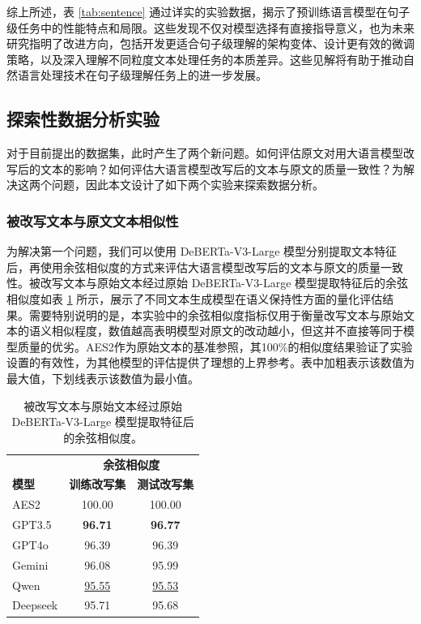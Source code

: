 综上所述，表 \ref{tab:sentence} 通过详实的实验数据，揭示了预训练语言模型在句子级任务中的性能特点和局限。这些发现不仅对模型选择有直接指导意义，也为未来研究指明了改进方向，包括开发更适合句子级理解的架构变体、设计更有效的微调策略，以及深入理解不同粒度文本处理任务的本质差异。这些见解将有助于推动自然语言处理技术在句子级理解任务上的进一步发展。

\subsection{探索性数据分析实验}
\label{sec:method-experiment-analysis}

对于目前提出的数据集，此时产生了两个新问题。如何评估原文对用大语言模型改写后的文本的影响？如何评估大语言模型改写后的文本与原文的质量一致性？为解决这两个问题，因此本文设计了如下两个实验来探索数据分析。

\subsubsection{被改写文本与原文文本相似性}

为解决第一个问题，我们可以使用 DeBERTa-V3-Large 模型分别提取文本特征后，再使用余弦相似度的方式来评估大语言模型改写后的文本与原文的质量一致性。被改写文本与原始文本经过原始 DeBERTa-V3-Large 模型提取特征后的余弦相似度如表 \ref{tab:cos} 所示，展示了不同文本生成模型在语义保持性方面的量化评估结果。需要特别说明的是，本实验中的余弦相似度指标仅用于衡量改写文本与原始文本的语义相似程度，数值越高表明模型对原文的改动越小，但这并不直接等同于模型质量的优劣。AES2作为原始文本的基准参照，其100\%的相似度结果验证了实验设置的有效性，为其他模型的评估提供了理想的上界参考。表中加粗表示该数值为最大值，下划线表示该数值为最小值。

\begin{table}[htbp]
\centering
\caption{被改写文本与原始文本经过原始 DeBERTa-V3-Large 模型提取特征后的余弦相似度。}
\begin{tabular}{l|c|c}
\toprule
         & \multicolumn{2}{c}{\textbf{余弦相似度}} \\
\textbf{模型} & \textbf{训练改写集}      & \textbf{测试改写集}    \\ \midrule
AES2     & 100.00                 & 100.00                \\
GPT3.5   & \textbf{96.71}         & \textbf{96.77}        \\
GPT4o    & 96.39                  & 96.39                 \\
Gemini   & 96.08                  & 95.99                 \\
Qwen     & \uline{95.55}          & \uline{95.53}         \\
Deepseek & 95.71                  & 95.68                 \\ \bottomrule
\end{tabular}
\label{tab:cos}
\end{table}

